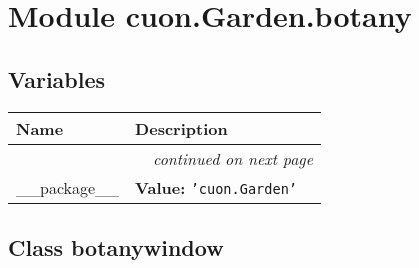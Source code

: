 %
%
%


\section{Module cuon.Garden.botany}

    \label{cuon:Garden:botany}


  \subsection{Variables}

    \vspace{-1cm}
\hspace{\varindent}\begin{longtable}{|p{\varnamewidth}|p{\vardescrwidth}|l}
\cline{1-2}
\cline{1-2} \centering \textbf{Name} & \centering \textbf{Description}& \\
\cline{1-2}
\endhead\cline{1-2}\multicolumn{3}{r}{\small\textit{continued on next page}}\\\endfoot\cline{1-2}
\endlastfoot\raggedright \_\-\_\-p\-a\-c\-k\-a\-g\-e\-\_\-\_\- & \raggedright \textbf{Value:} 
{\tt \texttt{'}\texttt{cuon.Garden}\texttt{'}}&\\
\cline{1-2}
\end{longtable}



\subsection{Class botanywindow}

